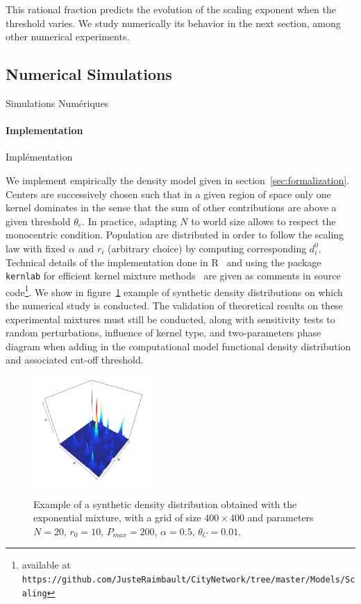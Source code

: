 This rational fraction predicts the evolution of the scaling exponent when the threshold varies. We study numerically its behavior in the next section, among other numerical experiments.


\subsection{Numerical Simulations}{Simulations Numériques}

\paragraph{Implementation}{Implémentation}

We implement empirically the density model given in section~\ref{sec:formalization}. Centers are successively chosen such that in a given region of space only one kernel dominates in the sense that the sum of other contributions are above a given threshold $\theta_e$. In practice, adapting $N$ to world size allows to respect the monocentric condition. Population are distributed in order to follow the scaling law with fixed $\alpha$ and $r_i$ (arbitrary choice) by computing corresponding $d_i^0$. Technical details of the implementation done in R~\cite{R-Core-Team:2015fk} and using the package \texttt{kernlab} for efficient kernel mixture methods~\cite{Karatzoglou:2004uq} are given as comments in source code\footnote{available at \texttt{https://github.com/JusteRaimbault/CityNetwork/tree/master/Models/Scaling}}. We show in figure~\ref{fig:ex-distrib} example of synthetic density distributions on which the numerical study is conducted. The validation of theoretical results on these experimental mixtures must still be conducted, along with sensitivity tests to random perturbations, influence of kernel type, and two-parameters phase diagram when adding in the computational model functional density distribution and associated cut-off threshold.



\begin{figure}
\centering
\includegraphics[width=0.4\textwidth]{Figures/PartI/Methodology/Scaling/example_exp_mixture}
\caption[Synthetic density distribution]{Example of a synthetic density distribution obtained with the exponential mixture, with a grid of size $400\times 400$ and parameters $N=20$, $r_0=10$, $P_{max}=200$, $\alpha=0.5$, $\theta_C = 0.01$.}{}
\label{fig:ex-distrib}
\end{figure}



